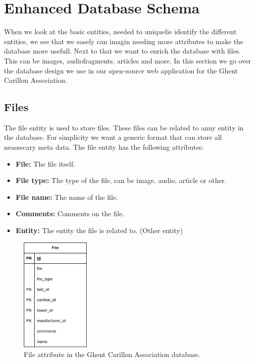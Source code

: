 \documentclass[11pt, a4paper]{article}
\begin{document}
\section{Enhanced Database Schema}

When we look at the basic entities, needed to uniquelie identify the different entities, we see that we easely can imagin needing more attributes to make the database more usefull. Next to that we want to enrich the database with files. This can be images, audiofragments, articles and more. In this section we go over the database design we use in our open-source web application for the Ghent Carillon Association.

\subsection{Files}

The file entity is used to store files. These files can be related to anny entity in the database. For simplicity we want a generic format that can store all neassecary meta data. The file entity has the following attributes:

\begin{itemize}
    \item \textbf{File:} The file itself.
    \item \textbf{File type:} The type of the file, can be image, audio, article or other.
    \item \textbf{File name:} The name of the file.
    \item \textbf{Comments:} Comments on the file.
    \item \textbf{Entity:} The entity the file is related to. (Other entity)
\end{itemize}

\begin{figure}[h!]
    \centering
    \includegraphics[width=0.3\textwidth]{images/file.png}
    \caption{File attribute in the Ghent Carillon Association database.}
    \label{fig:file-entity}
\end{figure}
\end{document}
